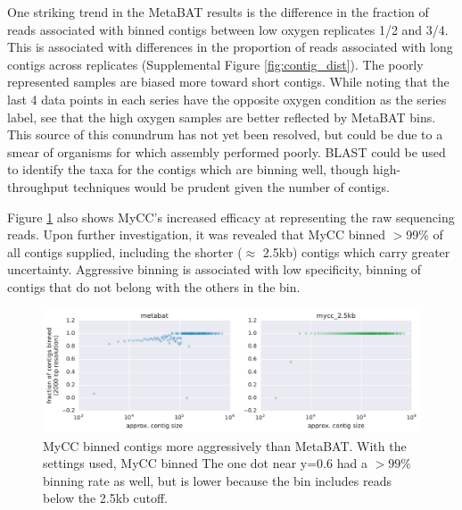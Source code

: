 One striking trend in the MetaBAT results is the difference in the fraction of reads associated with binned contigs between low oxygen replicates 1/2 and 3/4.
This is associated with differences in the proportion of reads associated with long contigs across replicates (Supplemental Figure \ref{fig:contig_dist}).
The poorly represented samples are biased more toward short contigs.
While noting that the last 4 data points in each series have the opposite oxygen condition as the series label, see that the high oxygen samples are better reflected by MetaBAT bins.
This source of this conundrum has not yet been resolved, but could be due to a smear of organisms for which assembly performed poorly.
BLAST could be used to identify the taxa for the contigs which are binning well, though high-throughput techniques would be prudent given the number of contigs.

Figure \ref{fig:mycc_binned_more_contigs} also shows MyCC's increased efficacy at representing the raw sequencing reads.
Upon further investigation, it was revealed that MyCC binned $>$99\% of all contigs supplied, including the shorter ($\approx$ 2.5kb) contigs which carry greater uncertainty. %
Aggressive binning is associated with low specificity, binning of contigs that do not belong with the others in the bin.

\begin{figure}[H]
\centering
    \includegraphics[width=1.0\textwidth]{./tex/chapter2/figures/170206_improved_fracs_of_contigs_binned_by_MyCC.pdf}
    \begin{singlespace}
    \caption[MyCC binned contigs more aggressively than MetaBAT]{
        MyCC binned contigs more aggressively than MetaBAT.
        With the settings used, MyCC binned %
        The one dot near y=0.6 had a $>99\%$ binning rate as well, but is lower because the bin includes reads below the 2.5kb cutoff.
        }
    \label{fig:mycc_binned_more_contigs}
    \end{singlespace}
\end{figure}

